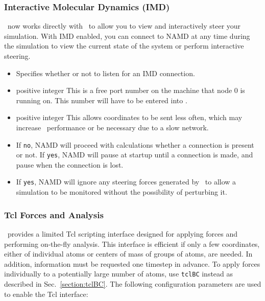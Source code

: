 \subsubsection{Interactive Molecular Dynamics (IMD)}

\NAMD\ now works directly with \VMD\ to allow you to view and interactively
steer your simulation.  With IMD enabled, you can connect to NAMD at any
time during the simulation to view the current state of the system or perform
interactive steering. 

\begin{itemize}
\item
{}
{Specifies whether or not to listen for an IMD connection.}

\item
{}
{positive integer}
{This is a free port number on the machine that node 0 is running on.
This number will have to be entered into \VMD.}

\item
{}
{positive integer}
{This allows coordinates to be sent less often, which may increase
\NAMD\ performance or be necessary due to a slow network.}

\item 
{}
{If {\tt no}, NAMD will proceed with calculations whether a connection is
present or not.  If {\tt yes}, NAMD will pause at startup until a connection is
made, and pause when the connection is lost.}

\item 
{}
{If {\tt yes}, NAMD will ignore any steering forces generated by \VMD\ to allow
a simulation to be monitored without the possibility of perturbing it.}

\end{itemize}


\subsubsection{Tcl Forces and Analysis}

\NAMD\ provides a limited Tcl scripting interface designed for applying forces and performing on-the-fly analysis.
This interface is efficient if only a few coordinates, either of individual atoms or centers of mass of groups of atoms, are needed.
In addition, information must be requested one timestep in advance.
To apply forces individually to a potentially large number of atoms, use
{\tt tclBC} instead as described in Sec.~\ref{section:tclBC}.
The following configuration parameters are used to enable the Tcl interface:

